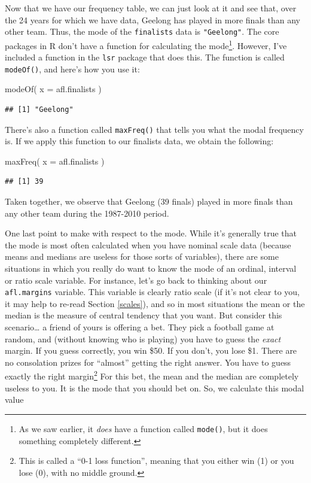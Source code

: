 \documentclass[
]{book}
\newenvironment{Shaded}{\begin{snugshade}}{\end{snugshade}}
\newcommand{\AttributeTok}[1]{\textcolor[rgb]{0.77,0.63,0.00}{#1}}
\newcommand{\FunctionTok}[1]{\textcolor[rgb]{0.00,0.00,0.00}{#1}}
\newcommand{\NormalTok}[1]{#1}
\begin{document}
Now that we have our frequency table, we can just look at it and see that, over the 24 years for which we have data, Geelong has played in more finals than any other team. Thus, the mode of the \texttt{finalists} data is \texttt{"Geelong"}. The core packages in R don't have a function for calculating the mode\footnote{As we saw earlier, it \emph{does} have a function called \texttt{mode()}, but it does something completely different.}. However, I've included a function in the \texttt{lsr} package that does this. The function is called \texttt{modeOf()}, and here's how you use it:

\begin{Shaded}
\begin{Highlighting}[]
\FunctionTok{modeOf}\NormalTok{( }\AttributeTok{x =}\NormalTok{ afl.finalists )}
\end{Highlighting}
\end{Shaded}

\begin{verbatim}
## [1] "Geelong"
\end{verbatim}

There's also a function called \texttt{maxFreq()} that tells you what the modal frequency is. If we apply this function to our finalists data, we obtain the following:

\begin{Shaded}
\begin{Highlighting}[]
\FunctionTok{maxFreq}\NormalTok{( }\AttributeTok{x =}\NormalTok{ afl.finalists )}
\end{Highlighting}
\end{Shaded}

\begin{verbatim}
## [1] 39
\end{verbatim}

Taken together, we observe that Geelong (39 finals) played in more finals than any other team during the 1987-2010 period.

One last point to make with respect to the mode. While it's generally true that the mode is most often calculated when you have nominal scale data (because means and medians are useless for those sorts of variables), there are some situations in which you really do want to know the mode of an ordinal, interval or ratio scale variable. For instance, let's go back to thinking about our \texttt{afl.margins} variable. This variable is clearly ratio scale (if it's not clear to you, it may help to re-read Section \ref{scales}), and so in most situations the mean or the median is the measure of central tendency that you want. But consider this scenario\ldots{} a friend of yours is offering a bet. They pick a football game at random, and (without knowing who is playing) you have to guess the \emph{exact} margin. If you guess correctly, you win \$50. If you don't, you lose \$1. There are no consolation prizes for ``almost'' getting the right answer. You have to guess exactly the right margin\footnote{This is called a ``0-1 loss function'', meaning that you either win (1) or you lose (0), with no middle ground.} For this bet, the mean and the median are completely useless to you. It is the mode that you should bet on. So, we calculate this modal value
\end{document}
